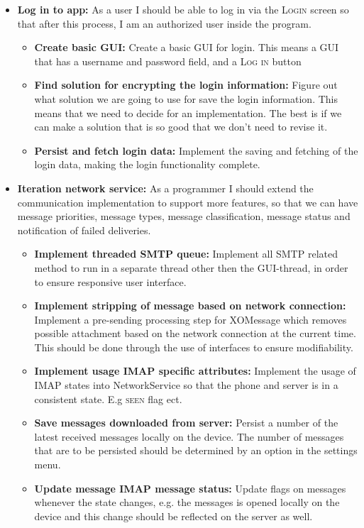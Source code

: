 \begin{itemize}
\item{}\textbf{Log in to app:} As a user I should be able to log in via the \textsc{Login} screen so that after this process, I am an authorized user inside the program.
\begin{itemize}
\item{}\textbf{Create basic GUI:} Create a basic GUI for login. This means a GUI that has a username and password field, and a \textsc{Log in} button
\item{}\textbf{Find solution for encrypting the login information:} Figure out what solution we are going to use for save the login information. This means that we need to decide for an implementation. The best is if we can make a solution that is so good that we don’t need to revise it.
\item{}\textbf{Persist and fetch login data:} Implement the saving and fetching of the login data, making the login functionality complete.
\end{itemize}
\item{}\textbf{Iteration network service:} As a programmer I should extend the communication implementation to support more features, so that we can have message priorities, message types, message classification, message status and notification of failed deliveries.
\begin{itemize}
\item{}\textbf{Implement threaded SMTP queue:} Implement all SMTP related method to run in a separate thread other then the GUI-thread, in order to ensure responsive user interface.
\item{}\textbf{Implement stripping of message based on network connection:} Implement a pre-sending processing step for XOMessage which removes possible attachment based on the network connection at the current time. This should be done through the use of interfaces to ensure modifiability. 
\item{}\textbf{Implement usage IMAP specific attributes:} Implement the usage of IMAP states into NetworkService so that the phone and server is in a consistent state. E.g \textsc{seen} flag ect. 
\item{}\textbf{Save messages downloaded from server:} Persist a number of the latest received messages locally on the device. The number of messages that are to be persisted should be determined by an option in the settings menu.
\item{}\textbf{Update message IMAP message status:} Update flags on messages whenever the state changes, e.g. the messages is opened locally on the device and this change should be reflected on the server as well.

\end{itemize}
\end{itemize}
